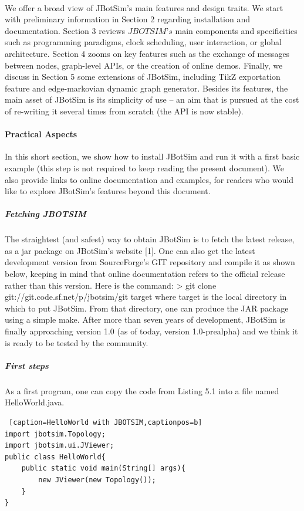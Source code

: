 \paragraph{}We offer a broad view of JBotSim's main features and design traits. We start with preliminary information in Section 2 regarding installation and documentation. Section 3 reviews $JBOTSIM’s$ main components and specificities such as programming paradigms, clock scheduling, user interaction, or global architecture. Section 4 zooms on key features such as the exchange of messages between nodes, graph-level APIs, or the creation of online demos. Finally, we discuss in Section 5 some extensions of JBotSim, including TikZ exportation feature and edge-markovian dynamic graph generator. Besides its features, the main asset of JBotSim is its simplicity of use – an aim that is pursued at the cost of re-writing it several times from scratch (the API is now stable).
\paragraph{Practical Aspects}In this short section, we show how to install JBotSim and run it with a first basic example (this step is not required to keep reading the present document). We also provide links to online documentation and examples, for readers who would like to explore JBotSim's features beyond this document.
\subparagraph{Fetching JBOTSIM}The straightest (and safest) way to obtain JBotSim is to fetch the latest release, as a jar package on  JBotSim’s website [1]. One can also get the latest development version from SourceForge’s GIT repository and compile it as shown below, keeping in mind that online documentation refers to the official release rather than this version. Here is the command:
\newline
> git clone git://git.code.sf.net/p/jbotsim/git target
\newline
where target is the local directory in which to put JBotSim. From that directory, one can produce the JAR package using a simple make. After more than seven years of development, JBotSim is finally approaching version 1.0 (as of today, version 1.0-prealpha) and we think it is ready to be tested by the community.
\subparagraph{First steps}As a first program, one can copy the code from Listing 5.1 into a file named HelloWorld.java.
\newpage
\begin{lstlisting} [caption=HelloWorld with JBOTSIM,captionpos=b]
import jbotsim.Topology;
import jbotsim.ui.JViewer;
public class HelloWorld{
	public static void main(String[] args){
		new JViewer(new Topology());
	} 
}
\end{lstlisting}


